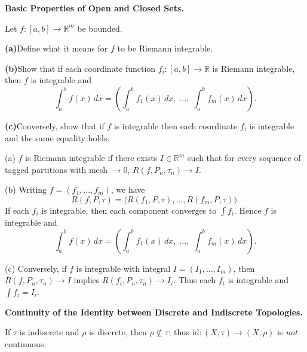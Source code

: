 \begin{problem}[CP-II-0007]
\label{prob:cp-ii-0007}
\textbf{Basic Properties of Open and Closed Sets.}

\hspace*{1.5em}Let $f:[a,b]\to\mathbb{R}^m$ be bounded.

	\par\smallskip\noindent\textbf{(a)}\quad Define what it means for $f$ to be Riemann integrable.
	\par\smallskip\noindent\textbf{(b)}\quad Show that if each coordinate function $f_i:[a,b]\to\mathbb{R}$ is Riemann integrable,
	then $f$ is integrable and
	\[
	\int_a^b f(x)\,dx = \left(\int_a^b f_1(x)\,dx,\;\dots,\;\int_a^b f_m(x)\,dx\right).
	\]
	\par\smallskip\noindent\textbf{(c)}\quad Conversely, show that if $f$ is integrable then each coordinate $f_i$ is integrable
	and the same equality holds.
\end{problem}

\begin{solution}
(a) $f$ is Riemann integrable if there exists $I\in\mathbb{R}^m$ such that for every
	sequence of tagged partitions with mesh $\to 0$, $R(f,P_n,\tau_n)\to I$.

	(b) Writing $f=(f_1,\dots,f_m)$, we have
	\[
	R(f,P,\tau) = \big(R(f_1,P,\tau),\dots,R(f_m,P,\tau)\big).
	\]
	If each $f_i$ is integrable, then each component converges to $\int f_i$.
	Hence $f$ is integrable and
	\[
	\int_a^b f(x)\,dx = \left(\int_a^b f_1(x)\,dx,\;\dots,\;\int_a^b f_m(x)\,dx\right).
	\]

	(c) Conversely, if $f$ is integrable with integral $I=(I_1,\dots,I_m)$, then
	$R(f,P_n,\tau_n)\to I$ implies $R(f_i,P_n,\tau_n)\to I_i$.
	Thus each $f_i$ is integrable and $\int f_i=I_i$.
\end{solution}

\begin{problem}[CP-II-0009]
\label{prob:cp-ii-0009}
\textbf{Continuity of the Identity between Discrete and Indiscrete Topologies.}

\hspace*{1.5em}If $\tau$ is indiscrete and $\rho$ is discrete, then $\rho\nsubseteq\tau$; thus $\mathrm{id}:(X,\tau)\to(X,\rho)$ is \emph{not} continuous.
\end{problem}

